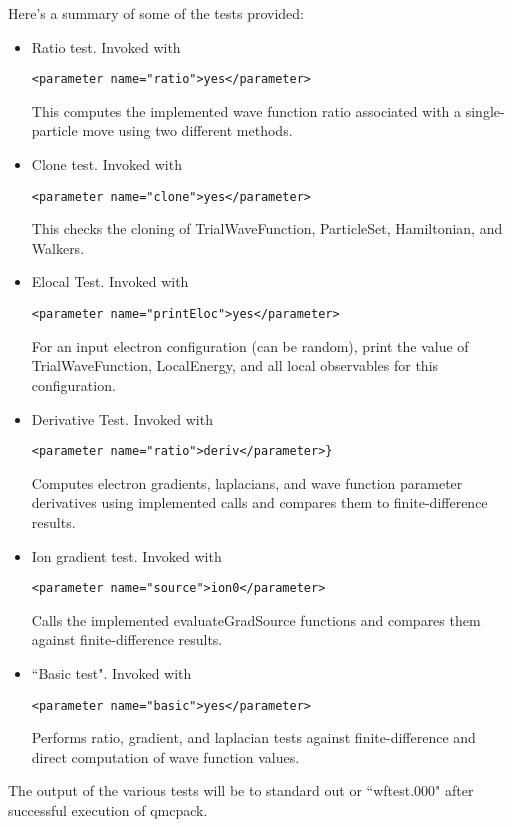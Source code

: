 Here's a summary of some of the tests provided:
\begin{itemize}
\item Ratio test.  Invoked with \begin{verbatim}<parameter name="ratio">yes</parameter>\end{verbatim}  This computes the implemented wave function ratio associated with a single-particle move using two different methods.
\item Clone test. Invoked with \begin{verbatim}<parameter name="clone">yes</parameter>\end{verbatim}  This checks the cloning of TrialWaveFunction, ParticleSet, Hamiltonian, and Walkers.  
\item Elocal Test.  Invoked with \begin{verbatim}<parameter name="printEloc">yes</parameter>\end{verbatim}  For an input electron configuration (can be random), print the value of TrialWaveFunction, LocalEnergy, and all local observables for this configuration.  
\item Derivative Test.  Invoked with \begin{verbatim}<parameter name="ratio">deriv</parameter>}\end{verbatim}  Computes electron gradients, laplacians, and wave function parameter derivatives using implemented calls and compares them to finite-difference results.   
\item Ion gradient test.  Invoked with \begin{verbatim}<parameter name="source">ion0</parameter>\end{verbatim}  Calls the implemented evaluateGradSource functions and compares them against finite-difference results.  
\item ``Basic test".  Invoked with \begin{verbatim}<parameter name="basic">yes</parameter>\end{verbatim}  Performs ratio, gradient, and laplacian tests against finite-difference and direct computation of wave function values.  

\end{itemize}

The output of the various tests will be to standard out or ``wftest.000" after successful execution of qmcpack.  
 
